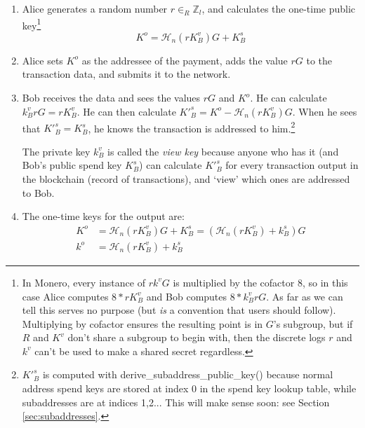 \begin{enumerate}
	\item Alice generates a random number $r \in_R \mathbb{Z}_l$, and calculates the one-time public key\footnote{In Monero, every instance of $r k^v G$ is multiplied by the cofactor 8, so in this case Alice computes $8*r K^v_B$ and Bob computes $8*k^v_B r G$. As far as we can tell this serves no purpose (but {\em is} a convention that users should follow). Multiplying by cofactor ensures the resulting point is in $G$'s subgroup, but if $R$ and $K^v$ don't share a subgroup to begin with, then the discrete logs $r$ and $k^v$ can't be used to make a shared secret regardless.}\vspace{.2cm}
	\[ K^o  = \mathcal{H}_n(r K_B^v)G + K_B^s \]

	\item Alice sets $K^o$ as the addressee of the payment, adds the value $r G$ to the transaction data, and submits it to the network.
	
	\item 	Bob receives the data and sees the values $r G$ and $K^o$. He can calculate $k_B^v r G = r K_B^v$. He can then calculate $K'^s_B = K^o - \mathcal{H}_n(r K_B^v)G$. When he sees that $K'^s_B = K_B^s$, he knows the transaction is addressed to him.\footnote{$K'^s_B $ is computed with derive\_subaddress\_public\_key() because normal address spend keys are stored at index 0 in the spend key lookup table, while subaddresses are at indices 1,2... This will make sense soon: see Section \ref{sec:subaddresses}.}
	
	The private key $k_B^v$ is called the {\em view key} because anyone who has it (and Bob’s public spend key $K_B^s$) can calculate $K'^s_B$ for every transaction output in the blockchain (record of transactions), and ‘view’ which ones are addressed to Bob.
	
	\item The one-time keys for the output are:\vspace{.2cm}
	\begin{align*}
		K^o &= \mathcal{H}_n(r K_B^v)G + K_B^s = (\mathcal{H}_n(r K_B^v) + k_B^s)G  \\ 
		k^o &= \mathcal{H}_n(r K_B^v) + k_B^s
	\end{align*}
\end{enumerate}

